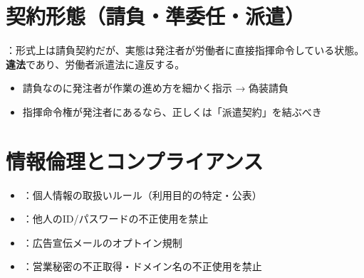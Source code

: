 \section{契約形態（請負・準委任・派遣）}

\begin{hikaku}[3つの契約形態の比較]
\end{hikaku}

\begin{teigi}[偽装請負とは]
：形式上は請負契約だが、実態は発注者が労働者に直接指揮命令している状態。
\textbf{違法}であり、労働者派遣法に違反する。
\begin{itemize}
  \item 請負なのに発注者が作業の進め方を細かく指示 → 偽装請負
  \item 指揮命令権が発注者にあるなら、正しくは「派遣契約」を結ぶべき
\end{itemize}
\end{teigi}

\section{情報倫理とコンプライアンス}

\begin{teigi}[主要な法律]
\begin{itemize}
  \item {}：個人情報の取扱いルール（利用目的の特定・公表）
  \item {}：他人のID/パスワードの不正使用を禁止
  \item {}：広告宣伝メールのオプトイン規制
  \item {}：営業秘密の不正取得・ドメイン名の不正使用を禁止
\end{itemize}
\end{teigi}

